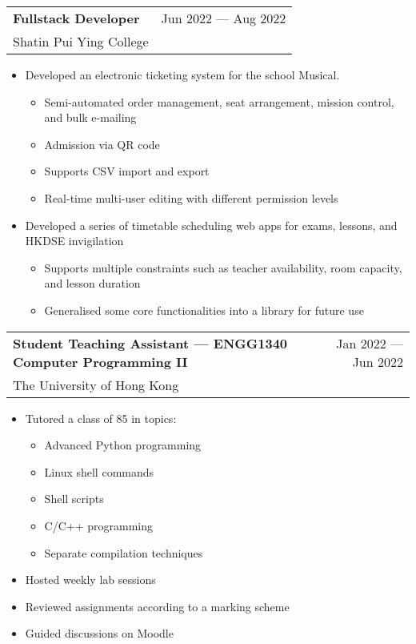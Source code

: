\documentclass{article}
\makeatletter
\newcommand{\jobTitle}[3]{
    \vspace{0.3cm}
    \begin{tabular*}{1\textwidth}{||l@{\extracolsep{\fill}}r}
        \textbf{#1} & #2\\
        #3 &
    \end{tabular*}
}
\makeatother
\begin{document}
\jobTitle
{Fullstack Developer}
{Jun 2022 --- Aug 2022}
{Shatin Pui Ying College}
\begin{itemize}[leftmargin=1.2cm]
    \item Developed an electronic ticketing system for the school Musical.
    \begin{itemize}
        \item Semi-automated order management, seat arrangement, mission control, and bulk e-mailing
        \item Admission via QR code
        \item Supports CSV import and export
        \item Real-time multi-user editing with different permission levels
    \end{itemize}
    \item Developed a series of timetable scheduling web apps for exams, lessons, and HKDSE invigilation
    \begin{itemize}
        \item Supports multiple constraints such as teacher availability, room capacity, and lesson duration
        \item Generalised some core functionalities into a library for future use
    \end{itemize}
\end{itemize}

\jobTitle
{Student Teaching Assistant --- ENGG1340 Computer Programming II}
{Jan 2022 --- Jun 2022}
{The University of Hong Kong}
\begin{itemize}[leftmargin=1.2cm]
    \item Tutored a class of 85 in topics:
    \begin{itemize}
        \item Advanced Python programming
        \item Linux shell commands
        \item Shell scripts
        \item C/C++ programming
        \item Separate compilation techniques
    \end{itemize}
    \item Hosted weekly lab sessions
    \item Reviewed assignments according to a marking scheme
    \item Guided discussions on Moodle
\end{itemize}
\end{document}
